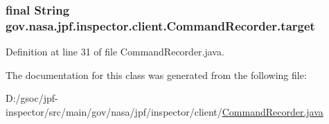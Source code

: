 \subsubsection[{\texorpdfstring{target}{target}}]{\setlength{\rightskip}{0pt plus 5cm}final String gov.\+nasa.\+jpf.\+inspector.\+client.\+Command\+Recorder.\+target\hspace{0.3cm}{\ttfamily [private]}}\hypertarget{classgov_1_1nasa_1_1jpf_1_1inspector_1_1client_1_1_command_recorder_aefb118ba4cce5d17fabc04cf09e1ba22}{}\label{classgov_1_1nasa_1_1jpf_1_1inspector_1_1client_1_1_command_recorder_aefb118ba4cce5d17fabc04cf09e1ba22}


Definition at line 31 of file Command\+Recorder.\+java.



The documentation for this class was generated from the following file\+:\begin{DoxyCompactItemize}
\item 
D\+:/gsoc/jpf-\/inspector/src/main/gov/nasa/jpf/inspector/client/\hyperlink{_command_recorder_8java}{Command\+Recorder.\+java}\end{DoxyCompactItemize}
